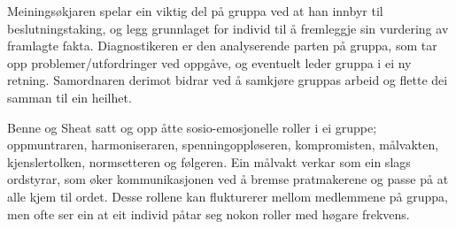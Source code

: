 Meiningsøkjaren spelar ein viktig del på gruppa ved at han innbyr til beslutningstaking, og legg grunnlaget for individ til å fremleggje sin vurdering av framlagte fakta. Diagnostikeren er den analyserende parten på gruppa, som tar opp problemer/utfordringer ved oppgåve, og eventuelt leder gruppa i ei ny retning. Samordnaren derimot bidrar ved å samkjøre gruppas arbeid og flette dei samman til ein heilhet.

Benne og Sheat satt og opp åtte sosio-emosjonelle roller i ei gruppe; oppmuntraren, harmoniseraren, spenningoppløseren, kompromisten, målvakten, kjenslertolken, normsetteren og følgeren. Ein målvakt verkar som ein slags ordstyrar, som øker kommunikasjonen ved å bremse pratmakerene og passe på at alle kjem til ordet. Desse rollene kan flukturerer mellom medlemmene på gruppa, men ofte ser ein at eit individ påtar seg nokon roller med høgare frekvens.